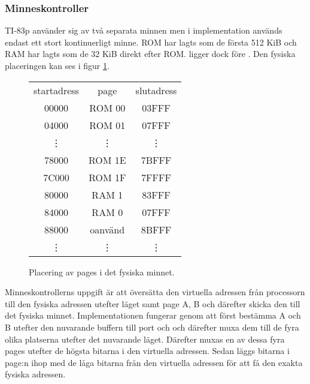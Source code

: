 \documentclass[main.tex]{subfiles}
\begin{document}
\subsubsection{Minneskontroller}
\label{sec:mmap}
TI-83p använder sig av två separata minnen men i implementation används endast
ett stort kontinuerligt minne. ROM har lagts som de första 512 KiB och RAM har
lagts som de 32 KiB direkt efter ROM.  ligger dock före . Den fysiska placeringen kan ses i figur \ref{fig:physical}.
\begin{figure}[H]
    \center
    \small\ttfamily\arraybackslash
    \begin{tabular}{c|c|c}
        \multicolumn{1}{c}{\normalfont startadress} &
        \multicolumn{1}{c}{\normalfont page} &
        \multicolumn{1}{c}{\normalfont slutadress} \\ \cline{2-2}
        00000  & ROM 00  & 03FFF \\ \cline{2-2}
        04000  & ROM 01  & 07FFF \\
        \multicolumn{1}{c}{\vdots} &
        \multicolumn{1}{c}{\vdots} & \vdots \\
        78000  & ROM 1E  & 7BFFF \\ \cline{2-2}
        7C000  & ROM 1F  & 7FFFF \\ \cline{2-2}
        80000  & RAM 1   & 83FFF \\ \cline{2-2}
        84000  & RAM 0   & 07FFF \\ \cline{2-2}
        88000  & oanvänd & 8BFFF \\ \cline{2-2}
        \vdots & \vdots  & \vdots \\
    \end{tabular}
    \caption{Placering av pages i det fysiska minnet.}
    \label{fig:physical}
\end{figure}
Minneskontrollerns uppgift är att översätta den virtuella adressen från
processorn till den fysiska adressen utefter läget samt page A, B och därefter
skicka den till det fysiska minnet. Implementationen fungerar genom att först
bestämma A och B utefter den nuvarande buffern till port  och
 och därefter muxa dem till de fyra olika platserna utefter det
nuvarande läget. Därefter muxas en av dessa fyra pages utefter de högsta
bitarna i den virtuella adressen. Sedan läggs bitarna i page:n ihop med de låga
bitarna från den virtuella adressen för att få den exakta fysiska adressen.
\end{document}
